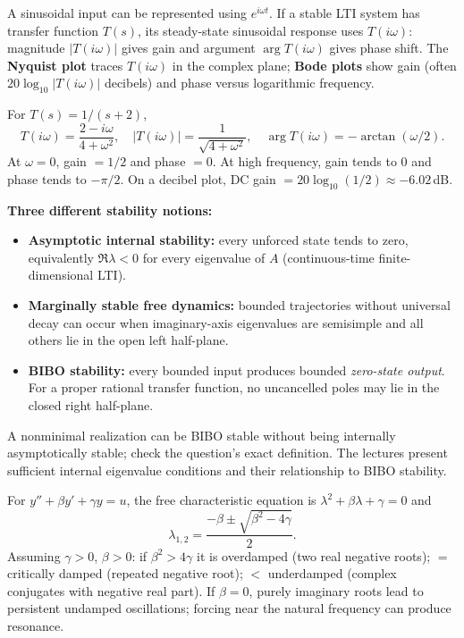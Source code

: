 \documentclass[10pt,a4paper]{article}
\begin{document}
\begin{defbox}A sinusoidal input can be represented using $e^{i\omega t}$. If a stable LTI system has transfer function $T(s)$, its steady-state sinusoidal response uses $T(i\omega)$: magnitude $|T(i\omega)|$ gives gain and argument $\arg T(i\omega)$ gives phase shift. The \textbf{Nyquist plot} traces $T(i\omega)$ in the complex plane; \textbf{Bode plots} show gain (often $20\log_{10}|T(i\omega)|$ decibels) and phase versus logarithmic frequency.
\end{defbox}
\begin{workbox}[title={WORKED: frequency response of a first-order filter}]
For $T(s)=1/(s+2)$,
\[T(i\omega)=\frac{2-i\omega}{4+\omega^2},\quad |T(i\omega)|=\frac1{\sqrt{4+\omega^2}},\quad \arg T(i\omega)=-\arctan(\omega/2).\]
At $\omega=0$, gain $=1/2$ and phase $=0$. At high frequency, gain tends to 0 and phase tends to $-\pi/2$. On a decibel plot, DC gain $=20\log_{10}(1/2)\approx-6.02\,$dB.
\end{workbox}
\begin{formbox}\textbf{Three different stability notions:}
\begin{itemize}
\item \textbf{Asymptotic internal stability:} every unforced state tends to zero, equivalently $\Re\lambda<0$ for every eigenvalue of $A$ (continuous-time finite-dimensional LTI).
\item \textbf{Marginally stable free dynamics:} bounded trajectories without universal decay can occur when imaginary-axis eigenvalues are semisimple and all others lie in the open left half-plane.
\item \textbf{BIBO stability:} every bounded input produces bounded \emph{zero-state output}. For a proper rational transfer function, no uncancelled poles may lie in the closed right half-plane.
\end{itemize}
A nonminimal realization can be BIBO stable without being internally asymptotically stable; check the question's exact definition. The lectures present sufficient internal eigenvalue conditions and their relationship to BIBO stability.
\end{formbox}
\begin{workbox}[title={WORKED: damping classifications}]
For $y''+\beta y'+\gamma y=u$, the free characteristic equation is $\lambda^2+\beta\lambda+\gamma=0$ and
\[\lambda_{1,2}=\frac{-\beta\pm\sqrt{\beta^2-4\gamma}}2.\]
Assuming $\gamma>0$, $\beta>0$: if $\beta^2>4\gamma$ it is overdamped (two real negative roots); $=$ critically damped (repeated negative root); $<$ underdamped (complex conjugates with negative real part). If $\beta=0$, purely imaginary roots lead to persistent undamped oscillations; forcing near the natural frequency can produce resonance.
\end{workbox}
\end{document}
